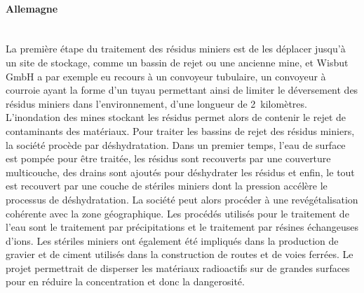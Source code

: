 \documentclass{article}
\begin{document}
\paragraph{Allemagne \\ \\}
La première étape du traitement des résidus miniers est de les déplacer jusqu’à un site de stockage, comme un bassin de rejet ou une ancienne mine, et Wisbut GmbH a par exemple eu recours à un convoyeur tubulaire, un convoyeur à courroie ayant la forme d’un tuyau permettant ainsi de limiter le déversement des résidus miniers dans l’environnement, d’une longueur de 2~kilomètres. L’inondation des mines stockant les résidus permet alors de contenir le rejet de contaminants des matériaux. Pour traiter les bassins de rejet des résidus miniers, la société procède par déshydratation. Dans un premier temps, l’eau de surface est pompée pour être traitée, les résidus sont recouverts par une couverture multicouche, des drains sont ajoutés pour déshydrater les résidus et enfin, le tout est recouvert par une couche de stériles miniers dont la pression accélère le processus de déshydratation. La société peut alors procéder à une revégétalisation cohérente avec la zone géographique. Les procédés utilisés pour le traitement de l’eau sont le traitement par précipitations et le traitement par résines échangeuses d’ions.
Les stériles miniers ont également été impliqués dans la production de gravier et de ciment utilisés dans la construction de routes et de voies ferrées. Le projet permettrait de disperser les matériaux radioactifs sur de grandes surfaces pour en réduire la concentration et donc la dangerosité.
\end{document}
